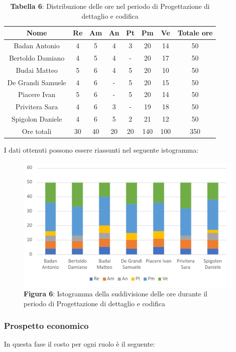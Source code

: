 \begin{table}[H]
	\centering
	\renewcommand{\arraystretch}{1.5}
	\begin{tabular}{|c|c|c|c|c|c|c|c|}
		\hline
		\rowcolor{lighter-grayer}
		Nome & Re & Am & An & Pt & Pm & Ve & Totale ore\\
		\hline
		Badan Antonio & 4 & 5 & 4 &  3 & 20 & 14 & 50 \\
		\hline
		Bertoldo Damiano & 4 & 5 & 4 & - & 20 & 17 & 50 \\
		\hline
		Budai Matteo & 5 & 6 & 4 & 5 & 20 & 10 & 50 \\
		\hline
		De Grandi Samuele & 4 & 6 & - & 5 & 20 & 15 & 50 \\
		\hline
		Piacere Ivan & 5 & 6 & - & 5 & 20 & 14 & 50 \\
		\hline
		Privitera Sara & 4 & 6 & 3 & - & 19 & 18 & 50 \\
		\hline
		Spigolon Daniele & 4 & 6 & 5 & 2 & 21 & 12 & 50 \\
		\hline
		Ore totali & 30 & 40 & 20 & 20 & 140 & 100 & 350 \\
		\hline
	\end{tabular}
	\caption*{\textbf{Tabella 6}: Distribuzione delle ore nel periodo di Progettazione di dettaglio e codifica\\}
\end{table}	
I dati ottenuti possono essere riassunti nel seguente istogramma:

\begin{figure}[H]
	\centering
	\includegraphics[width=0.7\linewidth]{res/images/IstogrammaFase3.png}
	\caption*{\textbf{Figura 6}: Istogramma della suddivisione delle ore durante il periodo di Progettazione di dettaglio e codifica}
	\label{fig:Figura10}
\end{figure}


\subsubsection{Prospetto economico}
In questa fase il costo per ogni ruolo è il seguente:

